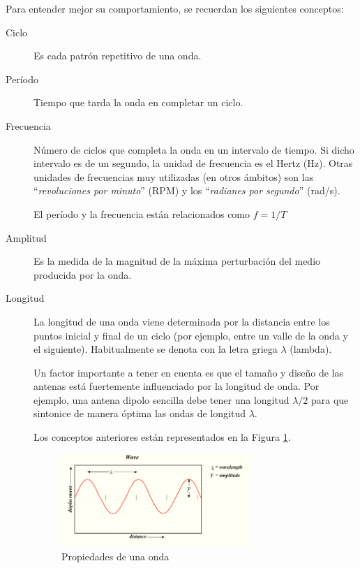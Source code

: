 Para entender mejor su comportamiento, se recuerdan los siguientes conceptos:

\begin{description}
\item [Ciclo] Es cada patr\'on repetitivo de una onda.

\item  [Per\'iodo] Tiempo que tarda la onda en completar un ciclo.

\item  [Frecuencia] N\'umero de ciclos que completa la onda en un intervalo de
  tiempo. Si dicho intervalo es de un segundo, la unidad de frecuencia
  es el Hertz (Hz). Otras unidades de frecuencias muy utilizadas (en
  otros \'ambitos) son las ``\textit{revoluciones por minuto}'' (RPM) y los
  ``\textit{radianes por segundo}'' (rad/s).

El per\'iodo y la frecuencia est\'an relacionados como $ f = 1/T $

\item [Amplitud] Es la medida de la magnitud de la m\'axima perturbaci\'on del medio producida por la onda.

\item [Longitud] La longitud de una onda viene determinada por la distancia entre los puntos inicial y final de un ciclo (por ejemplo, entre un valle de la onda y el siguiente). Habitualmente se denota con la letra griega $\lambda$ (lambda).



Un factor importante a tener en cuenta es que el tama\~no y dise\~no de las antenas est\'a fuertemente influenciado por la longitud de onda. Por ejemplo, una antena dipolo sencilla debe tener una longitud $\lambda/2$ para que sintonice de manera \'optima las ondas de longitud $\lambda$.

Los conceptos anteriores est\'an representados en la Figura \ref{fig:propiedades-onda}.

\begin{figure}[!h]
  \centering
 \includegraphics[width=0.7\textwidth]{./Imagenes/06.01.adf/propiedades-onda.png}  
  \caption{Propiedades de una onda \cite{wikipedia_esp}}
  \label{fig:propiedades-onda}
\end{figure}



\end{description}
